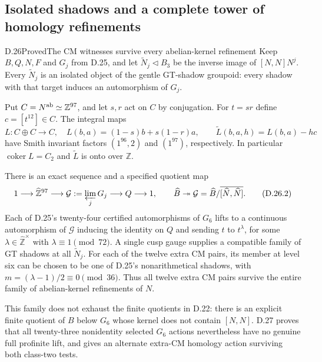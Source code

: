 \subsection{Isolated shadows and a complete tower of homology refinements}

\begin{statement}{D.26}{Proved}{The CM witnesses survive every abelian-kernel refinement}
Keep $B,Q,N,F$ and $G_j$ from D.25, and let
$\widetilde N_j\triangleleft B_3$ be the inverse image of
$[N,N]N^j$. Every $\widetilde N_j$ is an isolated object of
the gentle GT-shadow groupoid: every shadow with that target
induces an automorphism of $G_j$.

Put $C=N^{\rm ab}\simeq\mathbb Z^{97}$, and let $s,r$ act
on $C$ by conjugation. For $t=sr$ define $c=[t^{12}]\in C$.
The integral maps
\[
 L:C\oplus C\longrightarrow C,\quad
 L(b,a)=(1-s)b+s(1-r)a,\qquad
 \widetilde L(b,a,h)=L(b,a)-hc                         \tag{D.26.1}
\]
have Smith invariant factors $(1^{96},2)$ and $(1^{97})$,
respectively. In particular $\operatorname{coker}L=C_2$
and $\widetilde L$ is onto over $\mathbb Z$.

There is an exact sequence and a specified quotient map
\[
 1\longrightarrow\widehat{\mathbb Z}^{97}
 \longrightarrow\mathcal G:=\varprojlim_j G_j
 \longrightarrow Q\longrightarrow1,\qquad
 \widehat B\twoheadrightarrow\mathcal G
   =\widehat B/\overline{[\widehat N,\widehat N]} .       \tag{D.26.2}
\]
Each of D.25's twenty-four certified automorphisms of $G_6$
lifts to a continuous automorphism of $\mathcal G$ inducing
the identity on $Q$ and sending $t$ to $t^\lambda$, for some
$\lambda\in\widehat{\mathbb Z}^{\times}$ with
$\lambda\equiv1\pmod{72}$. A single cusp gauge supplies a
compatible family of GT shadows at all $\widetilde N_j$.
For each of the twelve extra CM pairs, its member at level six
can be chosen to be one of D.25's nonarithmetical shadows,
with $m=(\lambda-1)/2\equiv0\pmod{36}$.
Thus all twelve extra CM pairs survive the entire family of
abelian-kernel refinements of $N$.

This family does not exhaust the finite quotients in D.22:
there is an explicit finite quotient of $B$ below $G_6$ whose
kernel does not contain $[N,N]$. D.27 proves that all
twenty-three nonidentity selected $G_6$ actions nevertheless
have no genuine full profinite lift, and gives an alternate
extra-CM homology action surviving both class-two tests.
\end{statement}
